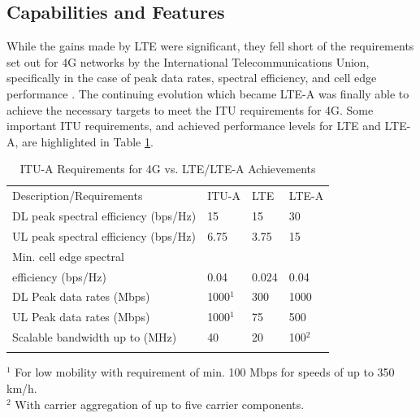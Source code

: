 \subsection{Capabilities and Features}

While the gains made by LTE were significant, they fell short of the requirements set out for 4G networks by the International Telecommunications Union, specifically in the case of peak data rates, spectral efficiency, and cell edge performance \cite{itu-advanced}.  The continuing evolution which became \mbox{LTE-A} was finally able to achieve the necessary targets to meet the ITU requirements for 4G.  Some important ITU requirements, and achieved performance levels for LTE and \mbox{LTE-A}, are highlighted in Table \ref{perf-table}.

\begin{table}
	\caption{ITU-A Requirements for 4G vs. LTE/\mbox{LTE-A} Achievements \cite{lte-3gpp}\cite{lteA-3gpp}\cite{itu-advanced}\cite{abdullah}}
	\label{perf-table}      
	\begin{tabular}{p{}p{}p{}p{}}
		\hline\noalign{\smallskip}
		Description/Requirements & ITU-A & LTE & \mbox{LTE-A}   \\
		\noalign{\smallskip}\svhline\noalign{\smallskip}
		DL peak spectral efficiency (bps/Hz) &  15   & 15  & 30 \\
		UL peak spectral efficiency (bps/Hz)& 6.75  & 3.75  & 15 \\
		Min. cell edge spectral \\ \hspace{0.8em} efficiency (bps/Hz) & 0.04 & 0.024 & 0.04 \\
		DL Peak data rates (Mbps) & 1000$^1$  & 300 & 1000 \\
		UL Peak data rates (Mbps) & 1000$^1$  & 75 & 500 \\
		Scalable bandwidth up to (MHz) & 40 & 20  & 100$^2$ \\
		
		\noalign{\smallskip}\hline\noalign{\smallskip}
	\end{tabular}
	$^1$ For low mobility with requirement of min. 100 Mbps for speeds of up to 350 km/h. 	 \\
	$^2$ With carrier aggregation of up to five carrier components.
\end{table}

